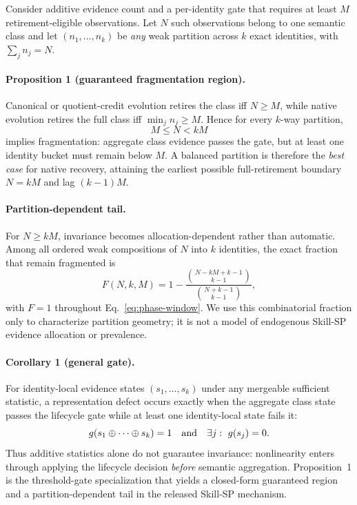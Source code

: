 Consider additive evidence count and a per-identity gate that requires at least $M$ retirement-eligible observations. Let $N$ such observations belong to one semantic class and let $(n_1,\ldots,n_k)$ be \emph{any} weak partition across $k$ exact identities, with $\sum_j n_j=N$.

\paragraph{Proposition 1 (guaranteed fragmentation region).}
Canonical or quotient-credit evolution retires the class iff $N\ge M$, while native evolution retires the full class iff $\min_j n_j\ge M$. Hence for every $k$-way partition,
\begin{equation}
\label{eq:phase-window}
M\le N<kM
\end{equation}
implies fragmentation: aggregate class evidence passes the gate, but at least one identity bucket must remain below $M$. A balanced partition is therefore the \emph{best case} for native recovery, attaining the earliest possible full-retirement boundary $N=kM$ and lag $(k-1)M$.

\paragraph{Partition-dependent tail.}
For $N\ge kM$, invariance becomes allocation-dependent rather than automatic. Among all ordered weak compositions of $N$ into $k$ identities, the exact fraction that remain fragmented is
\begin{equation}
\label{eq:partition-fraction}
F(N,k,M)=1-\frac{\binom{N-kM+k-1}{k-1}}{\binom{N+k-1}{k-1}},
\end{equation}
with $F=1$ throughout Eq.~\ref{eq:phase-window}. We use this combinatorial fraction only to characterize partition geometry; it is not a model of endogenous Skill-SP evidence allocation or prevalence.

\paragraph{Corollary 1 (general gate).}
For identity-local evidence states $(s_1,\ldots,s_k)$ under any mergeable sufficient statistic, a representation defect occurs exactly when the aggregate class state passes the lifecycle gate while at least one identity-local state fails it:
\[
g(s_1\oplus\cdots\oplus s_k)=1
\quad\text{and}\quad
\exists j:\ g(s_j)=0.
\]
Thus additive statistics alone do not guarantee invariance: nonlinearity enters through applying the lifecycle decision \emph{before} semantic aggregation. Proposition~1 is the threshold-gate specialization that yields a closed-form guaranteed region and a partition-dependent tail in the released Skill-SP mechanism.

